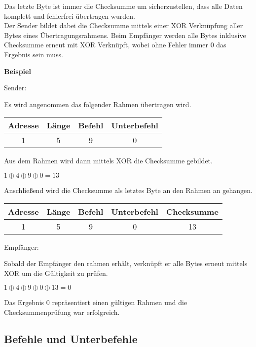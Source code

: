 Das letzte Byte ist immer die Checksumme um sicherzustellen, dass alle Daten komplett und fehlerfrei übertragen wurden.\\
Der Sender bildet dabei die Checksumme mittels einer XOR Verknüpfung aller Bytes eines Übertragungsrahmens. Beim Empfänger werden alle Bytes inklusive Checksumme erneut mit XOR Verknüpft, wobei ohne Fehler immer 0 das Ergebnis sein muss.

\textbf{Beispiel}

Sender:
 
Es wird angenommen das folgender Rahmen übertragen wird.
\begin{center}
\begin{tabular}{|c|c|c|c|}\hline
  Adresse & Länge & Befehl & Unterbefehl \\ \hline
  1 & 5 & 9 & 0 \\ \hline
\end{tabular}
\end{center}
Aus dem Rahmen wird dann mittels XOR die Checksumme gebildet.

\begin{center}
{\Large$1 \oplus 4 \oplus 9 \oplus 0 = 13$}\\
\end{center}

Anschließend wird die Checksumme als letztes Byte an den Rahmen an gehangen.
\begin{center}
\begin{tabular}{|c|c|c|c|c|}\hline
  Adresse & Länge & Befehl & Unterbefehl & Checksumme \\ \hline
  1 & 5 & 9 & 0 & 13 \\ \hline
\end{tabular}
\end{center}

Empfänger:

Sobald der Empfänger den rahmen erhält, verknüpft er alle Bytes erneut mittels XOR um die Gültigkeit zu prüfen.

\begin{center}
{\Large $1 \oplus 4 \oplus 9 \oplus 0 \oplus 13 = 0$}\\
\end{center}

Das Ergebnis 0 repräsentiert einen gültigen Rahmen und die Checksummenprüfung war erfolgreich.


\subsection{Befehle und Unterbefehle}

